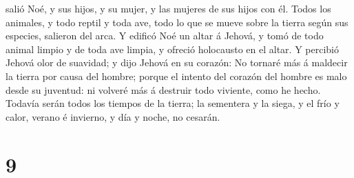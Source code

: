 salió Noé, y sus hijos, y su mujer, y las mujeres de sus hijos con él.
 Todos los animales, y todo reptil y toda ave, todo lo
que se mueve sobre la tierra según sus especies, salieron del arca.
 Y edificó Noé un altar á Jehová, y tomó de todo animal
limpio y de toda ave limpia, y ofreció holocausto en el altar.
 Y percibió Jehová olor de suavidad; y dijo Jehová en su
corazón: No tornaré más á maldecir la tierra por causa del hombre;
porque el intento del corazón del hombre es malo desde su juventud: ni
volveré más á destruir todo viviente, como he hecho. 
Todavía serán todos los tiempos de la tierra; la sementera y la siega, y
el frío y calor, verano é invierno, y día y noche, no cesarán.

\hypertarget{section-8}{%
\section{9}\label{section-8}}

